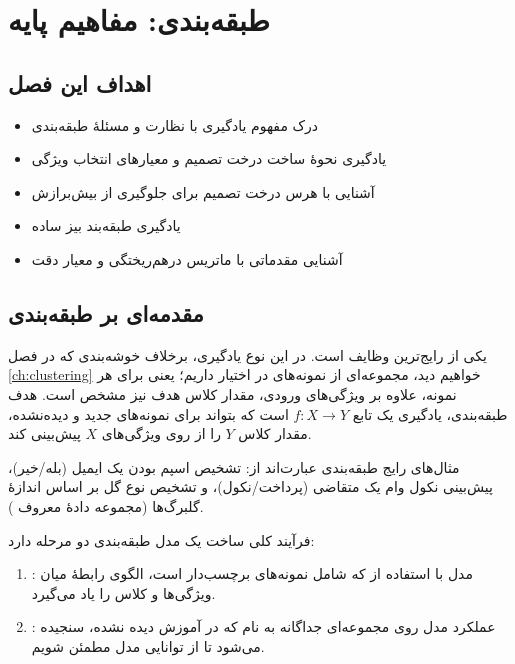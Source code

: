 \chapter{طبقه‌بندی: مفاهیم پایه}
\label{ch:classification-basic}

\section*{اهداف این فصل}
\begin{itemize}
    \item درک مفهوم یادگیری با نظارت و مسئلهٔ طبقه‌بندی
    \item یادگیری نحوهٔ ساخت درخت تصمیم و معیارهای انتخاب ویژگی
    \item آشنایی با هرس درخت تصمیم برای جلوگیری از بیش‌برازش
    \item یادگیری طبقه‌بند بیز ساده
    \item آشنایی مقدماتی با ماتریس درهم‌ریختگی و معیار دقت
\end{itemize}

\section{مقدمه‌ای بر طبقه‌بندی}
\label{sec:classification-intro}

 یکی از رایج‌ترین وظایف
 است. در این نوع یادگیری،
برخلاف خوشه‌بندی که در فصل \ref{ch:clustering} خواهیم دید، مجموعه‌ای از
نمونه‌های  در اختیار داریم؛ یعنی
برای هر نمونه، علاوه بر ویژگی‌های ورودی، مقدار کلاس هدف نیز مشخص است. هدف
طبقه‌بندی، یادگیری یک تابع $f: X \rightarrow Y$ است که بتواند برای
نمونه‌های جدید و دیده‌نشده، مقدار کلاس $Y$ را از روی ویژگی‌های $X$
پیش‌بینی کند.

مثال‌های رایج طبقه‌بندی عبارت‌اند از: تشخیص اسپم بودن یک ایمیل (بله/خیر)،
پیش‌بینی نکول وام یک متقاضی (پرداخت/نکول)، و تشخیص نوع گل بر اساس اندازهٔ
گلبرگ‌ها (مجموعه دادهٔ معروف ).

فرآیند کلی ساخت یک مدل طبقه‌بندی دو مرحله دارد:

\begin{enumerate}
    \item {}: مدل با استفاده از
           که شامل نمونه‌های
          برچسب‌دار است، الگوی رابطهٔ میان ویژگی‌ها و کلاس را یاد می‌گیرد.
    \item {}: عملکرد مدل روی مجموعه‌ای
          جداگانه به نام  که در آموزش دیده
          نشده، سنجیده می‌شود تا از توانایی
           مدل مطمئن شویم.
\end{enumerate}

